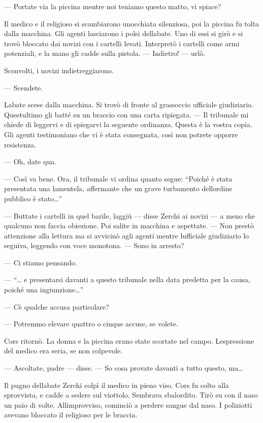 --- Portate via la piccina mentre noi teniamo questo matto, vi spiace?

Il medico e il religioso si scambiarono un\textquotesingle occhiata
silenziosa, poi la piccina fu tolta dalla macchina. Gli agenti
lasciarono i polsi dell\textquotesingle abate. Uno di essi si girò e si
trovò bloccato dai novizi con i cartelli levati. Interpretò i cartelli
come armi potenziali, e la mano gli cadde sulla pistola. --- Indietro!
--- urlò.

Sconvolti, i novizi indietreggiarono.

--- Scendete.

L\textquotesingle abate scese dalla macchina. Si trovò di fronte al
grassoccio ufficiale giudiziario. Quest\textquotesingle ultimo gli batté
su un braccio con una carta ripiegata. --- Il tribunale mi chiede di
leggervi e di spiegarvi la seguente ordinanza. Questa è la vostra copia.
Gli agenti testimoniano che vi è stata consegnata, così non potrete
opporre resistenza.

--- Oh, date qua.

--- Così va bene. Ora, il tribunale vi ordina quanto segue: ``Poiché è
stata presentata una lamentela, affermante che un grave turbamento
dell\textquotesingle ordine pubblico è stato\ldots''

--- Buttate i cartelli in quel barile, laggiù --- disse Zerchi ai novizi
--- a meno che qualcuno non faccia obiezione. Poi salite in macchina e
aspettate. --- Non prestò attenzione alla lettura ma si avvicinò agli
agenti mentre l\textquotesingle ufficiale giudiziario lo seguiva,
leggendo con voce monotona. --- Sono in arresto?

--- Ci stiamo pensando.

--- ``\ldots{} e presentarsi davanti a questo tribunale nella data
predetta per la causa, poiché una ingiunzione\ldots''

--- C\textquotesingle è qualche accusa particolare?

--- Potremmo elevare quattro o cinque accuse, se volete.

Cors ritornò. La donna e la piccina erano state scortate nel campo.
L\textquotesingle espressione del medico era seria, se non colpevole.

--- Ascoltate, padre --- disse. --- So cosa provate davanti a tutto
questo, ma\ldots{}

Il pugno dell\textquotesingle abate Zerchi colpì il medico in pieno
viso. Cors fu colto alla sprovvista, e cadde a sedere sul viottolo.
Sembrava sbalordito. Tirò su con il naso un paio di volte.
All\textquotesingle improvviso, cominciò a perdere sangue dal naso. I
poliziotti avevano bloccato il religioso per le braccia.

